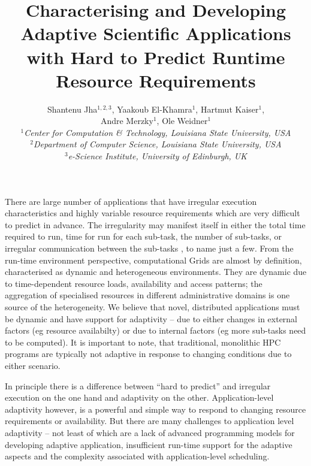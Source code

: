 \documentclass[a4paper,10pt]{article}
\begin{document}
\title{\large Characterising and Developing Adaptive Scientific
  Applications with Hard to Predict Runtime Resource Requirements}

\author{Shantenu Jha$^{1,2,3}$, Yaakoub El-Khamra$^{1}$, Hartmut Kaiser$^{1}$, \\ Andre Merzky$^{1}$, Ole Weidner$^{1}$ \\
  \small{\emph{$^{1}$Center for Computation \& Technology, Louisiana State University, USA}}\\
  \small{\emph{$^{2}$Department of Computer Science, Louisiana State
      University, USA}}\\
  \small{\emph{$^{3}$e-Science Institute, University of Edinburgh,
      UK}}}

\maketitle

There are large number of applications that have irregular execution
characteristics and highly variable resource requirements which are
very difficult to predict in advance.  The irregularity may manifest
itself in either the total time required to run, time for run for each
sub-task, the number of sub-tasks, or irregular communication between
the sub-tasks , to name just a few.  From the run-time environment
perspective, computational Grids are almost by definition,
characterised as dynamic and heterogeneous environments.  They are
dynamic due to time-dependent resource loads, availability and access
patterns; the aggregation of specialised resources in different
administrative domains is one source of the heterogeneity.  We believe
that novel, distributed applications must be dynamic and have support
for adaptivity -- due to either changes in external factors (eg
resource availabilty) or due to internal factors (eg more sub-tasks
need to be computed).  It is important to note, that traditional,
monolithic HPC programs are typically not adaptive in response to
changing conditions due to either scenario.

In principle there is a difference between ``hard to predict'' and
irregular execution on the one hand and adaptivity on the other.
Application-level adaptivity however, is a powerful and simple way to
respond to changing resource requirements or availability.  But there
are many challenges to application level adaptivity -- not least of
which are a lack of advanced programming models for developing
adaptive application, insufficient run-time support for the adaptive
aspects and the complexity associated with application-level
scheduling.
\end{document}
